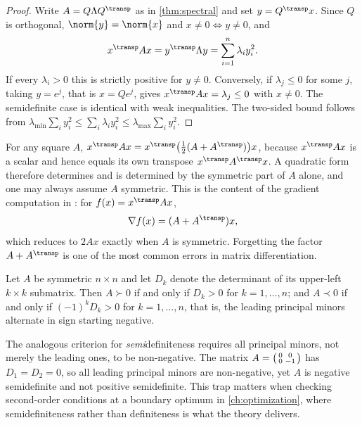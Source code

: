 \begin{proof}
	Write $A=Q\Lambda Q^{\transp}$ as in \autoref{thm:spectral} and set
	$y=Q^{\transp}x$. Since $Q$ is orthogonal, $\norm{y}=\norm{x}$ and
	$x\neq0\iff y\neq0$, and
	\[
		x^{\transp}Ax=y^{\transp}\Lambda y=\sum_{i=1}^n\lambda_iy_i^2 .
	\]
	If every $\lambda_i>0$ this is strictly positive for $y\neq0$. Conversely, if
	$\lambda_j\leq0$ for some $j$, taking $y=e^j$, that is $x=Qe^j$, gives
	$x^{\transp}Ax=\lambda_j\leq0$ with $x\neq0$. The semidefinite case is
	identical with weak inequalities. The two-sided bound follows from
	$\lambda_{\min}\sum_iy_i^2\leq\sum_i\lambda_iy_i^2\leq\lambda_{\max}\sum_iy_i^2$.
\end{proof}

\begin{remark}\label{rem:symmetric-part}
	For any square $A$, $x^{\transp}Ax=x^{\transp}\bigl(\tfrac12(A+A^{\transp})
		\bigr)x$, because $x^{\transp}Ax$ is a scalar and hence equals its own
	transpose $x^{\transp}A^{\transp}x$. A quadratic form therefore determines and
	is determined by the symmetric part of $A$ alone, and one may always assume $A$
	symmetric. This is the content of the gradient computation in
	\autocite[slide 49]{fukuda2026calculus}: for $f(x)=x^{\transp}Ax$,
	\[
		\nabla f(x)=(A+A^{\transp})x,
	\]
	which reduces to $2Ax$ exactly when $A$ is symmetric. Forgetting the factor
	$A+A^{\transp}$ is one of the most common errors in matrix differentiation.
\end{remark}

\begin{proposition}\label{prop:sylvester}
	Let $A$ be symmetric $n\times n$ and let $D_k$ denote the determinant of its
	upper-left $k\times k$ submatrix. Then $A\succ0$ if and only if $D_k>0$ for
	$k=1,\dots,n$; and $A\prec0$ if and only if $(-1)^kD_k>0$ for $k=1,\dots,n$,
	that is, the leading principal minors alternate in sign starting negative.
\end{proposition}

\begin{remark}\label{rem:semidefinite-minors}
	The analogous criterion for \emph{semi}definiteness requires all principal
	minors, not merely the leading ones, to be non-negative. The matrix
	$A=\begin{psmallmatrix}0&0\\0&-1\end{psmallmatrix}$ has $D_1=D_2=0$, so all
	leading principal minors are non-negative, yet $A$ is negative semidefinite and
	not positive semidefinite. This trap matters when checking second-order
	conditions at a boundary optimum in \autoref{ch:optimization}, where
	semidefiniteness rather than definiteness is what the theory delivers.
\end{remark}

